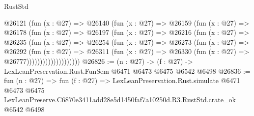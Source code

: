 \begin{lexlean}{RustStd}
\begin{coremodule}
                  @26121
                    (fun (x : @27) =>
                    @26140
                      (fun (x : @27) =>
                      @26159
                        (fun (x : @27) =>
                        @26178
                          (fun (x : @27) =>
                          @26197
                            (fun (x : @27) =>
                            @26216
                              (fun (x : @27) =>
                              @26235
                                (fun (x : @27) =>
                                @26254
                                  (fun (x : @27) =>
                                  @26273
                                    (fun (x : @27) =>
                                    @26292
                                      (fun (x : @27) =>
                                      @26311
                                        (fun (x : @27) =>
                                        @26330 (fun (x : @27) => @26777))))))))))))))))))))
@26826 := (n : @27) -> (f : @27) -> LexLeanPreservation.Rust.FunSem @6471 @6473 @6475 @6542 @6498
@26836 := fun (n : @27) =>
  fun (f : @27) =>
  LexLeanPreservation.Rust.simulate
    @6471
    @6473
    @6475
    LexLeanPreserve.C6870e3411add28e5d1450faf7a10250d.R3.RustStd.crate_ok
    @6542
    @6498
\end{coremodule}
\end{lexlean}
